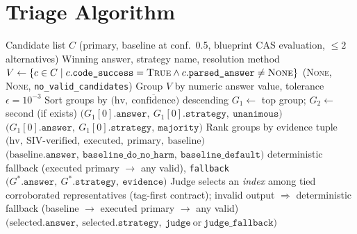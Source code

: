 \documentclass[11pt,a4paper]{article}
\begin{document}
\section{Triage Algorithm}
\label{app:triage}
\begin{algorithm}[H]
\caption{Majority-Vote Triage with Evidence Escalation and Baseline Anchor (v13.0). $\mathrm{hv}(G)$ denotes \emph{honest votes}: $|G|$, minus one when $G$ contains both \texttt{primary} and \texttt{blueprint\_eval}---one derivation observed twice, since they can only co-group when the execution audit certifies the code computed those very equations ().}
\label{alg:triage}
\begin{algorithmic}[1]
\Require Candidate list $C$ (primary, baseline at conf.~0.5, blueprint CAS evaluation, $\leq 2$ alternatives)
\Ensure Winning answer, strategy name, resolution method
\State $V \gets \{c \in C \mid c.\texttt{code\_success} = \textsc{True} \land c.\texttt{parsed\_answer} \neq \textsc{None}\}$
    \State \Return (\textsc{None}, \textsc{None}, \texttt{no\_valid\_candidates})
\EndIf
\State Group $V$ by numeric answer value, tolerance $\epsilon = 10^{-3}$
\State Sort groups by $\bigl(\mathrm{hv},\ \overline{\text{confidence}}\bigr)$ descending
\State $G_1 \gets$ top group; \quad $G_2 \gets$ second (if exists)
    \State \Return $\bigl(G_1[0].\texttt{answer},\ G_1[0].\texttt{strategy},\ \texttt{unanimous}\bigr)$
    \State \Return $\bigl(G_1[0].\texttt{answer},\ G_1[0].\texttt{strategy},\ \texttt{majority}\bigr)$
\Else
    \State Rank groups by evidence tuple $\bigl(\mathrm{hv},\ \text{SIV-verified},\ \text{executed},\ \text{primary},\ \text{baseline}\bigr)$
            \State \Return $\bigl(\text{baseline}.\texttt{answer},\ \texttt{baseline\_do\_no\_harm},\ \texttt{baseline\_default}\bigr)$
        \Else
            \State \Return deterministic fallback (executed primary $\to$ any valid), \texttt{fallback}
        \EndIf
        \State \Return $\bigl(G^{*}.\texttt{answer},\ G^{*}.\texttt{strategy},\ \texttt{evidence}\bigr)$
    \Else
        \State Judge selects an \emph{index} among tied corroborated representatives (tag-first contract); invalid output $\Rightarrow$ deterministic fallback (baseline $\to$ executed primary $\to$ any valid)
        \State \Return $\bigl(\text{selected}.\texttt{answer},\ \text{selected}.\texttt{strategy},\ \texttt{judge}\ \text{or}\ \texttt{judge\_fallback}\bigr)$
    \EndIf
\EndIf
\end{algorithmic}
\end{algorithm}
\end{document}

